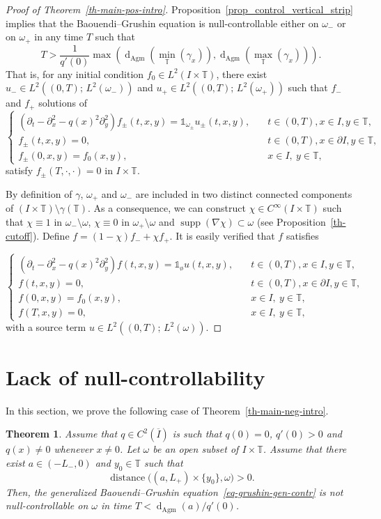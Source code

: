 \documentclass[10pt]{amsart}
\newtheorem{theo}{Theorem}[section]
\theoremstyle{definition}\newtheorem{defi}[theo]{Definition}\newtheorem{rema}[theo]{Remark}\newtheorem{exam}[theo]{Example}\newtheorem{exem}[theo]{Example}\newtheorem{nota}[theo]{Notation}
\newcommand{\1}{\mathds 1}
\DeclareMathOperator{\distance}{distance}
\DeclareMathOperator{\supp}{supp}
\newcommand{\dagmon}{\mathop{\mathrm{d}}\nolimits_{\mathrm{Agm}}}
\newcommand{\T}{\mathbb{T}}
\renewcommand{\o}{\omega}
\begin{document}
\begin{proof}[Proof of Theorem~\ref{th-main-pos-intro}]
Proposition~\ref{prop_control_vertical_strip} implies that the Baouendi--Grushin equation is null-controllable either on $\o_-$ or on $\o_+$ in any time $T$ such that
\[
T> \frac 1 {q'(0)} \max\left(\dagmon\left(\min_\T(\gamma_x)\right), \dagmon\left(\max_\T (\gamma_x)\right) \right).
\]
That is, for any initial condition $f_0 \in L^2(I\times \T)$, there exist $u_-\in L^2((0,T);\, L^2(\o_-))$ and $u_+\in L^2((0,T);\, L^2(\o_+))$ such that $f_-$ and $f_+$ solutions of
\[
\left\{
\begin{array}{ll}
\left(\partial_t-\partial_x^2 - q(x)^2 \partial_y^2\right)f_\pm(t,x,y) = \mathds 1_{\o_\pm} u_\pm(t,x,y),&\quad t\in (0,T), x\in I, y\in \T,\\
f_\pm(t,x,y) = 0,&\quad t\in (0,T), x\in\partial I, y\in \T, \\
f_\pm(0,x,y) = f_0(x,y), & \quad x \in I, \ y \in \T,
\end{array}\right.
\]
satisfy $f_\pm(T,\cdot,\cdot) = 0$ in $I\times \T$.

By definition of $\gamma$, $\omega_+$ and $\omega_-$ are included in two distinct connected components of $(I \times \T) \setminus \gamma(\T)$. As a consequence, we can construct $\chi \in C^\infty(I\times \T)$ such that $\chi \equiv 1$ in $\omega_-\setminus \omega$, $\chi \equiv 0$ in $\omega_+\setminus \omega$ and $\supp(\nabla \chi) \subset \o$ (see Proposition~\ref{th-cutoff}). Define $ f = (1-\chi) f_- + \chi f_+$. It is easily verified that $f$ satisfies

\[
\left\{
\begin{array}{ll}
\left(\partial_t-\partial_x^2 - q(x)^2 \partial_y^2\right)f(t,x,y) = \mathds 1_{\text{ø}} u(t,x,y), &\quad t\in (0,T), x\in I, y\in \T,\\
f(t,x,y) = 0,&\quad t\in (0,T), x\in\partial I, y\in \T, \\
f(0,x,y) = f_0(x,y), & \quad x \in I, \ y \in \T, \\
f(T,x,y) = 0, & \quad x \in I, \ y \in \T,
\end{array}\right.
\]
with a source term $u \in L^2((0,T);\, L^2(\o))$.
\end{proof}

\section{Lack of null-controllability}\label{sec_negative_result}
In this section, we prove the following case of Theorem~\ref{th-main-neg-intro}.


\begin{theo}\label{th-main-neg}
Assume that $q\in C^2(\overline I)$ is such that $q(0) = 0$, $q'(0) > 0$ and $q(x) \neq 0$ whenever $x\neq 0$. Let $\o$ be an open subset of $I\times \T$. Assume that there exist $a \in (-L_-,0)$ and $y_0 \in \T$ such that
\[
\distance\big((a,L_+)\times \{y_0\}, \o\big) > 0.
\]
Then, the generalized Baouendi--Grushin equation~\eqref{eq-grushin-gen-contr} is not null-controllable on $\o$ in time $T< \dagmon(a)/q'(0)$.
\end{theo}
\end{document}
